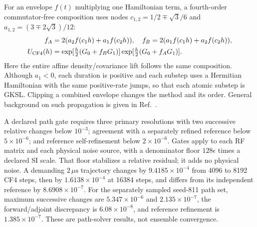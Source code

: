 For an envelope $f(t)$ multiplying one Hamiltonian term, a fourth-order
commutator-free composition uses nodes $c_{1,2}=1/2\mp\sqrt3/6$ and
$a_{1,2}=(3\mp2\sqrt3)/12$:
\begin{align}
 f_A&=2(a_2f(c_1h)+a_1f(c_2h)),\quad
 f_B=2(a_1f(c_1h)+a_2f(c_2h)),\nonumber\\
 U_{\rm CF4}(h)&=\exp[\tfrac h2(G_0+f_BG_1)]
                 \exp[\tfrac h2(G_0+f_AG_1)].
 \label{eq:gc-cf4}
\end{align}
Here the entire affine density/covariance lift follows the same composition.
Although $a_1<0$, each duration is positive and each substep uses a Hermitian
Hamiltonian with the same positive-rate jumps, so that each atomic substep is
GKSL. Clipping a combined envelope changes the method and its order.
General background on such propagation is given in
Ref.~\cite{Alvermann2012}.

A declared path gate requires three primary resolutions with two successive
relative changes below $10^{-3}$; agreement with a separately refined
reference below $5\times10^{-6}$; and reference self-refinement below
$2\times10^{-6}$. Gates apply to each RF matrix and each physical noise
source, with a denominator floor $128\epsilon$ times a declared SI scale.
That floor stabilizes a relative residual; it adds no physical noise.
A demanding $2\,\mu\mathrm s$ trajectory changes by $9.4185\times10^{-4}$
from 4096 to 8192 CF4 steps, then by $1.6138\times10^{-4}$ at 16384 steps,
and differs from its independent reference by $8.6908\times10^{-7}$.
For the separately sampled seed-811 path set, maximum successive changes are
$5.347\times10^{-6}$ and $2.135\times10^{-7}$, the forward/adjoint
discrepancy is $6.08\times10^{-8}$, and reference refinement is
$1.385\times10^{-7}$. These are path-solver results, not ensemble convergence.

